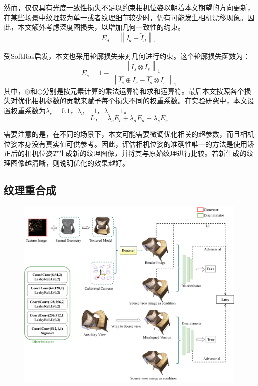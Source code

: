 然而，仅仅具有光度一致性损失不足以约束相机位姿以朝着本文期望的方向更新，在某些场景中纹理较为单一或者纹理细节较少时，仍有可能发生相机漂移现象。因此，本文额外考虑深度图损失，以增加几何一致性的约束。
\begin{equation}
	E_d = \left \| I_d - \tilde{I}_d  \right \|_1 
\end{equation}

受SoftRas启发，本文也采用轮廓损失来对几何进行约束。这个轮廓损失函数为：
\begin{equation}
	E_s = 1 - \frac{\left \| \hat{I_s}\otimes I_s  \right \|_1 }{\left \| \hat{I_s}\oplus  I_s- \hat{I_s}\otimes I_s \right \| }_1  
\end{equation}
其中，$\otimes $和$\oplus $分别是按元素计算的乘法运算符和求和运算符。最后本文按照各个损失对优化相机参数的贡献来赋予每个损失不同的权重系数。在实验研究中，本文设置权重系数为$\lambda_c = 0.1$，$\lambda_d = 1$，$\lambda_s = 1$。\
\begin{equation}
	L_T = \lambda_c E_c + \lambda_d E_d +\lambda_s E_s \label{pose}
\end{equation} \par

需要注意的是，在不同的场景下，本文可能需要微调优化相关的超参数，而且相机位姿本身没有真实值可供参考。因此，评估相机位姿的准确性唯一的方法是使用矫正后的相机位姿$T'$生成新的纹理图像，并将其与原始纹理进行比较。若新生成的纹理图像越清晰，则说明优化的效果越好。


\subsection{纹理重合成}

\begin{figure}[ht]
    \centering
    \includegraphics[width=1\columnwidth]{pic/work1/Texture.pdf}

    \label{fig:Texture}
\end{figure}

